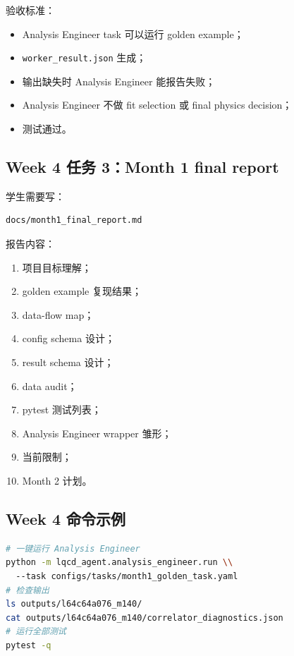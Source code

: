 \documentclass[11pt,a4paper,fontset=fandol]{ctexart}
\begin{document}
验收标准：

\begin{itemize}[leftmargin=2em]
  \item Analysis Engineer task 可以运行 golden example；
  \item \texttt{worker\_result.json} 生成；
  \item 输出缺失时 Analysis Engineer 能报告失败；
  \item Analysis Engineer 不做 fit selection 或 final physics decision；
  \item 测试通过。
\end{itemize}

\subsection{Week 4 任务 3：Month 1 final report}

学生需要写：

\begin{lstlisting}
docs/month1_final_report.md
\end{lstlisting}

报告内容：

\begin{enumerate}[leftmargin=2em]
  \item 项目目标理解；
  \item golden example 复现结果；
  \item data-flow map；
  \item config schema 设计；
  \item result schema 设计；
  \item data audit；
  \item pytest 测试列表；
  \item Analysis Engineer wrapper 雏形；
  \item 当前限制；
  \item Month 2 计划。
\end{enumerate}

\subsection{Week 4 命令示例}

\begin{lstlisting}[language=bash]
# 一键运行 Analysis Engineer
python -m lqcd_agent.analysis_engineer.run \\
  --task configs/tasks/month1_golden_task.yaml
# 检查输出
ls outputs/l64c64a076_m140/
cat outputs/l64c64a076_m140/correlator_diagnostics.json
# 运行全部测试
pytest -q
\end{lstlisting}
\end{document}
